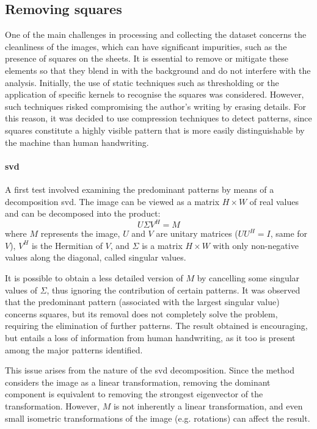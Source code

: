 \subsection{Removing squares}
    One of the main challenges in processing and collecting the dataset concerns the cleanliness of the images, which can have significant impurities, such as the presence of squares on the sheets. It is essential to remove or mitigate these elements so that they blend in with the background and do not interfere with the analysis. Initially, the use of static techniques such as thresholding or the application of specific kernels to recognise the squares was considered. However, such techniques risked compromising the author's writing by erasing details. For this reason, it was decided to use compression techniques to detect patterns, since squares constitute a highly visible pattern that is more easily distinguishable by the machine than human handwriting.

    \paragraph{\gls{svd}}
    A first test involved examining the predominant patterns by means of a decomposition \gls{svd}. The image can be viewed as a matrix $H \times W$ of real values and can be decomposed into the product:\\
    \[
    	U\Sigma V^H = M
    \]
    \noindent where $M$ represents the image, $U$ and $V$ are unitary matrices ($UU^H = I$, same for $V$), $V^H$ is the Hermitian of $V$, and $\Sigma$ is a matrix $H \times W$ with only non-negative values along the diagonal, called singular values.

    \noindent It is possible to obtain a less detailed version of $M$ by cancelling some singular values of $\Sigma$, thus ignoring the contribution of certain patterns. It was observed that the predominant pattern (associated with the largest singular value) concerns squares, but its removal does not completely solve the problem, requiring the elimination of further patterns. The result obtained is encouraging, but entails a loss of information from human handwriting, as it too is present among the major patterns identified.

    \noindent This issue arises from the nature of the \gls{svd} decomposition. Since the method considers the image as a linear transformation, removing the dominant component is equivalent to removing the strongest eigenvector of the transformation. However, $M$ is not inherently a linear transformation, and even small isometric transformations of the image (e.g. rotations) can affect the result.

